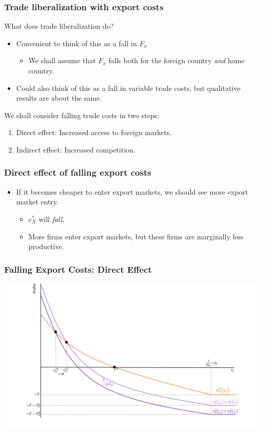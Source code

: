 \documentclass{beamer}
\begin{document}
\begin{frame}
	\frametitle{Trade liberalization with export costs}
What does trade liberalization do?
	\begin{itemize}
		\item Convenient to think of this as a fall in $F_x$ 
			\begin{itemize}
				\item We shall assume that $F_x$ falls both for the foreign country \emph{and} home country.
			\end{itemize}
	    \item Could also think of this as a fall in variable trade costs, but qualitative results are about the same. 
	\end{itemize}
We shall consider falling trade costs in two steps:
	\begin{enumerate}
		\item Direct effect: Increased access to foreign markets.
		\item Indirect effect: Increased competition.
	\end{enumerate}
\end{frame}


\begin{frame}
	\frametitle{Direct effect of falling export costs}
\begin{itemize}
	\item If it becomes cheaper to enter export markets, we should see more export market entry.
		\begin{itemize}
			\item $c^*_X$ will \emph{fall}.
			\item More firms enter export markets, but these firms are marginally less productive.
		\end{itemize}
\end{itemize}
\end{frame}

\begin{frame}
	\frametitle{Falling Export Costs: Direct Effect}
	\includegraphics[scale=0.32]{SL4_11.pdf}
	
\end{frame}
\end{document}
